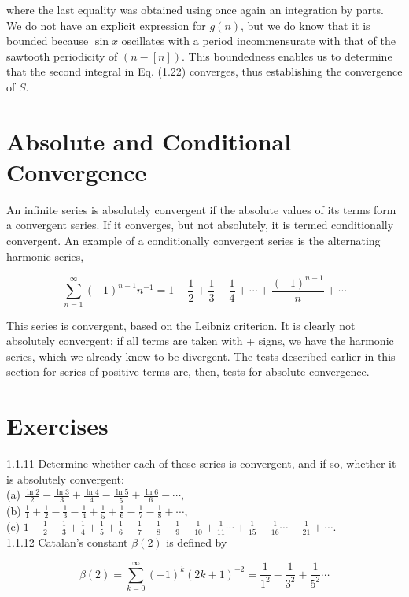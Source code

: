 \documentclass[10pt]{article}
\begin{document}
where the last equality was obtained using once again an integration by parts. We do not have an explicit expression for $g(n)$, but we do know that it is bounded because $\sin x$ oscillates with a period incommensurate with that of the sawtooth periodicity of $(n-[n])$. This boundedness enables us to determine that the second integral in Eq. (1.22) converges, thus establishing the convergence of $S$.

\section*{Absolute and Conditional Convergence}
An infinite series is absolutely convergent if the absolute values of its terms form a convergent series. If it converges, but not absolutely, it is termed conditionally convergent. An example of a conditionally convergent series is the alternating harmonic series,


\begin{equation*}
\sum_{n=1}^{\infty}(-1)^{n-1} n^{-1}=1-\frac{1}{2}+\frac{1}{3}-\frac{1}{4}+\cdots+\frac{(-1)^{n-1}}{n}+\cdots \tag{1.23}
\end{equation*}


This series is convergent, based on the Leibniz criterion. It is clearly not absolutely convergent; if all terms are taken with + signs, we have the harmonic series, which we already know to be divergent. The tests described earlier in this section for series of positive terms are, then, tests for absolute convergence.

\section*{Exercises}
1.1.11 Determine whether each of these series is convergent, and if so, whether it is absolutely convergent:\\
(a) $\frac{\ln 2}{2}-\frac{\ln 3}{3}+\frac{\ln 4}{4}-\frac{\ln 5}{5}+\frac{\ln 6}{6}-\cdots$,\\
(b) $\frac{1}{1}+\frac{1}{2}-\frac{1}{3}-\frac{1}{4}+\frac{1}{5}+\frac{1}{6}-\frac{1}{7}-\frac{1}{8}+\cdots$,\\
(c) $1-\frac{1}{2}-\frac{1}{3}+\frac{1}{4}+\frac{1}{5}+\frac{1}{6}-\frac{1}{7}-\frac{1}{8}-\frac{1}{9}-\frac{1}{10}+\frac{1}{11} \cdots+\frac{1}{15}-\frac{1}{16} \cdots-\frac{1}{21}+\cdots$.\\
1.1.12 Catalan's constant $\beta(2)$ is defined by

$$
\beta(2)=\sum_{k=0}^{\infty}(-1)^{k}(2 k+1)^{-2}=\frac{1}{1^{2}}-\frac{1}{3^{2}}+\frac{1}{5^{2}} \cdots
$$
\end{document}
